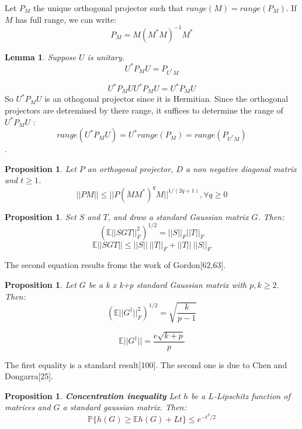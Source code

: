 \documentclass[onecolumn,11pt]{article}
\newtheorem{lemma}[theorem]{Lemma}
\newtheorem{proposition}[theorem]{Proposition}
\newenvironment{proof}[1][Proof]{\begin{trivlist}
\item[\hskip \labelsep {\bfseries #1}]}{\end{trivlist}}
\begin{document}
Let $P_M$ the unique orthogonal projector such that $range(M)=range(P_M)$. If $M$ has full range, we can write:
$$P_M=M(M^* M)^{-1} M^*$$

\begin{lemma}
Suppose $U$ is unitary. 
$$U^* P_M U=P_{U^* M}$$
\end{lemma}

\begin{proof}
$$U^* P_M U U^* P_M U=U^* P_M U$$ 
So $U^* P_M U$ is an othogonal projector since it is Hermitian. Since the orthogonal projectors are detremined by there range, it suffices to determine the range of $U^* P_M U$ :
$$range(U^* P_M U)=U^* range(P_M)=range(P_{U^* M})$$.
\end{proof}

\begin{proposition}
Let $P$ an orthogonal projector, $D$ a non negative diagonal matrix and $t\geq 1 $.
$$||PM||\leq ||P(MM^*)^q M||^{1/(2q+1)},\forall q\geq 0 $$
\end{proposition}

\begin{proposition}
Set $S$ and $T$, and draw a standard Gaussian matrix $G$. Then:
\begin{equation}
(\mathbb{E}||SGT||_F^2)^{1/2}=||S||_F||T||_F
\end{equation}
\begin{equation}
\mathbb{E}||SGT||\leq ||S||\ ||T||_F + ||T||\ ||S||_F
\end{equation}
\end{proposition}

The second equation results froms the work of Gordon[62,63].

\begin{proposition}
Let $G$ be a k x k+p standard Gaussian matrix with $p,k\geq 2$. Then:
\begin{equation}
(\mathbb{E}||G^{\dagger}||_F^2)^{1/2}=\sqrt{\frac{k}{p-1}}
\end{equation}

\begin{equation}
\mathbb{E}||G^{\dagger}||=\frac{e\sqrt{k+p}}{p}
\end{equation}
\end{proposition}

The first equality is a standard result[100]. The second one is due to Chen and Dongarra[25].

\begin{proposition} \textbf{Concentration inequality}
Let $h$ be a $L$-Lipschitz function of matrices and $G$ a standard gaussian matrix. Then:
\begin{equation}
\mathbb{P}\{h(G)\geq \mathbb{E}h(G)+Lt\}\leq e^{-t^2/2}
\end{equation}
\end{proposition}
\end{document}
